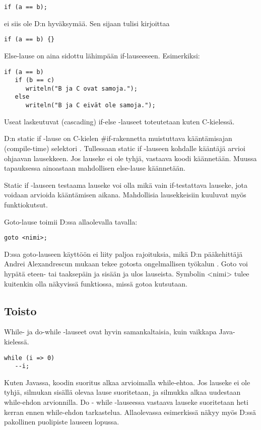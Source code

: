 \documentclass[11pt,oneside,a4paper]{article}
\begin{document}
\begin{verbatim}
if (a == b);
\end{verbatim}
ei siis ole D:n hyväksymää. Sen sijaan tulisi kirjoittaa

\begin{verbatim}
if (a == b) {}
\end{verbatim}
Else-lause on aina sidottu lähimpään if-lauseeseen. Esimerkiksi:

\begin{verbatim}
if (a == b)
   if (b == c)
      writeln("B ja C ovat samoja.");
   else
      writeln("B ja C eivät ole samoja.");
\end{verbatim}
Useat laskeutuvat (cascading) if-else -lauseet toteutetaan kuten C-kielessä.

D:n static if -lause on C-kielen \#if-rakennetta muistuttava kääntämisajan
(compile-time) selektori \cite{ALE10}.  Tullessaan static if -lauseen kohdalle kääntäjä arvioi
ohjaavan lausekkeen. Jos lauseke ei ole tyhjä, vastaava koodi käännetään. Muussa
tapauksessa ainoastaan mahdollisen else-lause käännetään. 

Static if -lauseen testaama lauseke voi olla mikä vain if-testattava lauseke,
jota voidaan arvioida kääntämisen aikana. Mahdollisia lausekkeisiin kuuluvat
myös funktiokutsut.

Goto-lause toimii D:ssa allaolevalla tavalla:

\begin{verbatim}
goto <nimi>;
\end{verbatim}
D:ssa goto-lauseen käyttöön ei liity paljoa rajoituksia, mikä D:n pääkehittäjä
Andrei Alexandrescun mukaan tekee gotosta ongelmallisen työkalun \cite{ALE10}. Goto voi
hypätä eteen- tai taaksepäin ja sisään ja ulos lauseista. Symbolin <nimi> tulee
kuitenkin olla näkyvissä funktiossa, missä gotoa kutsutaan. 

\subsection{Toisto}

While- ja do-while -lauseet ovat hyvin samankaltaisia, kuin vaikkapa
Java-kielessä. 

\begin{verbatim}
while (i => 0)
   --i;
\end{verbatim}
Kuten Javassa, koodin suoritus alkaa arvioimalla while-ehtoa. Jos lauseke ei ole
tyhjä, silmukan sisällä olevaa lause suoritetaan, ja silmukka alkaa uudestaan
while-ehdon arvionnilla. Do - while -lauseessa vastaava lauseke suoritetaan heti
kerran ennen while-ehdon tarkastelua. Allaolevassa esimerkissä näkyy myös D:ssä
pakollinen puolipiste lauseen lopussa.
\end{document}
